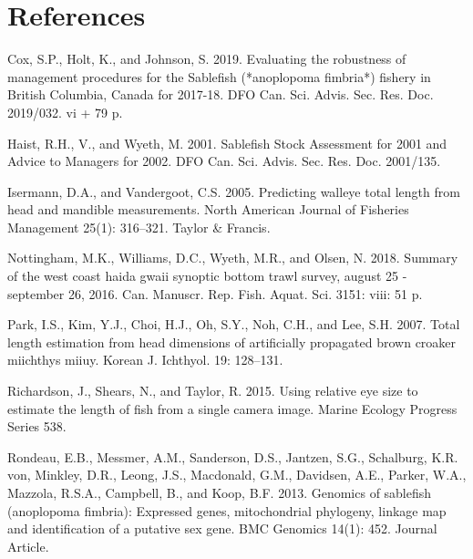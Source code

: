 \documentclass[12pt]{article}\usepackage[]{graphicx}\usepackage[]{color}
\begin{document}
\clearpage

\hypertarget{references}{%
\section{References}\label{references}}

\noindent \vspace{-2em} \setlength{\parindent}{-0.2in} \setlength{\leftskip}{0.2in} \setlength{\parskip}{8pt}

\hypertarget{refs}{}
\begin{CSLReferences}{1}{0}
%
Cox, S.P., Holt, K., and Johnson, S. 2019. Evaluating the robustness of management procedures for the {Sablefish} (*anoplopoma fimbria*) fishery in {British Columbia, Canada} for 2017-18. DFO Can. Sci. Advis. Sec. Res. Doc. 2019/032. vi + 79 p.

%
Haist, R.H., V., and Wyeth, M. 2001. Sablefish {Stock Assessment} for 2001 and {Advice to Managers} for 2002. DFO Can. Sci. Advis. Sec. Res. Doc. 2001/135.

%
Isermann, D.A., and Vandergoot, C.S. 2005. Predicting walleye total length from head and mandible measurements. North American Journal of Fisheries Management 25(1): 316--321. Taylor \& Francis.

%
Nottingham, M.K., Williams, D.C., Wyeth, M.R., and Olsen, N. 2018. Summary of the west coast haida gwaii synoptic bottom trawl survey, august 25 - september 26, 2016. Can. Manuscr. Rep. Fish. Aquat. Sci. 3151: viii: 51 p.

%
Park, I.S., Kim, Y.J., Choi, H.J., Oh, S.Y., Noh, C.H., and Lee, S.H. 2007. Total length estimation from head dimensions of artificially propagated brown croaker miichthys miiuy. Korean J. Ichthyol. 19: 128--131.

%
Richardson, J., Shears, N., and Taylor, R. 2015. Using relative eye size to estimate the length of fish from a single camera image. Marine Ecology Progress Series 538.

%
Rondeau, E.B., Messmer, A.M., Sanderson, D.S., Jantzen, S.G., Schalburg, K.R. von, Minkley, D.R., Leong, J.S., Macdonald, G.M., Davidsen, A.E., Parker, W.A., Mazzola, R.S.A., Campbell, B., and Koop, B.F. 2013. Genomics of sablefish (anoplopoma fimbria): Expressed genes, mitochondrial phylogeny, linkage map and identification of a putative sex gene. BMC Genomics 14(1): 452. Journal Article.


\end{CSLReferences}
\end{document}
